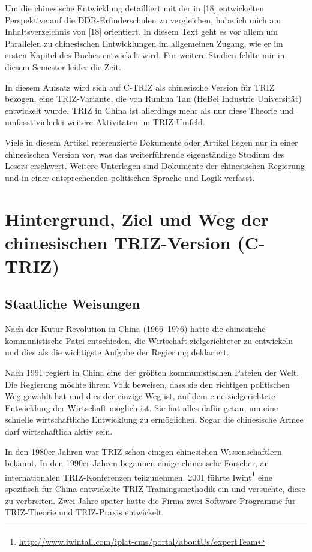 \documentclass[11pt,a4paper]{article}
\begin{document}
Um die chinesische Entwicklung detailliert mit der in [18] entwickelten
Perspektive auf die DDR-Erfinderschulen zu vergleichen, habe ich mich am
Inhaltsverzeichnis von [18] orientiert.  In diesem Text geht es vor allem um
Parallelen zu chinesischen Entwicklungen im allgemeinen Zugang, wie er im
ersten Kapitel des Buches entwickelt wird.  Für weitere Studien fehlte mir
in diesem Semester leider die Zeit.

In diesem Aufsatz wird sich auf C-TRIZ als chinesische Version für TRIZ
bezogen, eine TRIZ-Variante, die von Runhua Tan (HeBei Industrie Universität)
entwickelt wurde. TRIZ in China ist allerdings mehr als nur diese Theorie und
umfasst vielerlei weitere Aktivitäten im TRIZ-Umfeld. 

Viele in diesem Artikel referenzierte Dokumente oder Artikel liegen nur in
einer chinesischen Version vor, was das weiterführende eigenständige Studium
des Lesers erschwert. Weitere Unterlagen sind Dokumente der chinesischen
Regierung und in einer entsprechenden politischen Sprache und Logik verfasst.

\section{Hintergrund, Ziel und Weg der chinesischen TRIZ-Version (C-TRIZ)}

\subsection{Staatliche Weisungen}
Nach der Kutur-Revolution in China (1966--1976) hatte die chinesische
kommunistische Patei entschieden, die Wirtschaft zielgerichteter zu entwickeln
und dies als die wichtigste Aufgabe der Regierung deklariert.

Nach 1991 regiert in China eine der größten kommunistischen Pateien der Welt.
Die Regierung möchte ihrem Volk beweisen, dass sie den richtigen politischen
Weg gewählt hat und dies der einzige Weg ist, auf dem eine zielgerichtete
Entwicklung der Wirtschaft möglich ist. Sie hat alles dafür getan, um eine
schnelle wirtschaftliche Entwicklung zu ermöglichen. Sogar die chinesische
Armee darf wirtschaftlich aktiv sein.

In den 1980er Jahren war TRIZ schon einigen chinesichen Wissenschaftlern
bekannt.  In den 1990er Jahren begannen einige chinesische Forscher, an
internationalen TRIZ-Konferenzen teilzunehmen. 2001 führte
Iwint\footnote{\url{http://www.iwintall.com/iplat-cms/portal/aboutUs/expertTeam}}
eine spezifisch für China entwickelte TRIZ-Trainingsmethodik ein und
versuchte, diese zu verbreiten. Zwei Jahre später hatte die Firma zwei
Software-Programme für TRIZ-Theorie und TRIZ-Praxis entwickelt.
\end{document}
